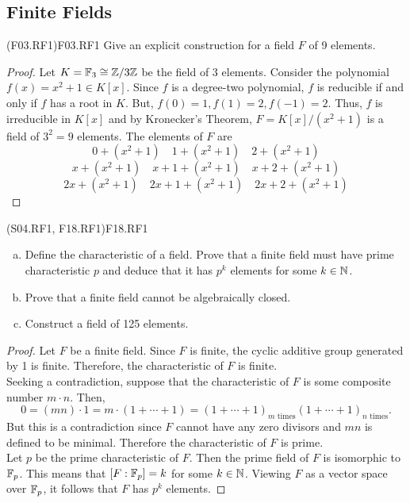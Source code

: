 \documentclass[../AlgebraQualSolutions.tex]{subfiles}
\begin{document}
\subsection{Finite Fields}

\begin{prob}{(F03.RF1)}{F03.RF1}
Give an explicit construction for a field $F$ of 9 elements.
\end{prob}
\begin{proof}
	Let $K = \mathbb{F}_3 \cong \mathbb{Z}/3\mathbb{Z}$ be the field of 3 elements. Consider the polynomial $f(x) = x^2 + 1 \in K[x]$. Since $f$ is a degree-two polynomial, $f$ is reducible if and only if $f$ has a root in $K$. But, $f(0) = 1, f(1) = 2, f(-1) = 2$. Thus, $f$ is irreducible in $K[x]$ and by Kronecker's Theorem, $F = K[x]/(x^2 + 1)$ is a field of $3^2 = 9$ elements. The elements of $F$ are
		\[0 + (x^2 + 1) \quad 1 + (x^2 + 1) \quad 2 + (x^2 + 1)\]
		\[x + (x^2 + 1) \quad x + 1 + (x^2 + 1) \quad x + 2 + (x^2 + 1)\]
		\[2x + (x^2 + 1) \quad 2x + 1 + (x^2 + 1) \quad 2x + 2 + (x^2 + 1)\]
\end{proof}

\begin{prob}{(S04.RF1, F18.RF1)}{F18.RF1}
	\begin{enumerate}[(a)]
		\item Define the characteristic of a field. Prove that a finite field must have prime characteristic $p$ and deduce that it has $p^k$ elements for some $k \in \mathbb{N}$.
		\item Prove  that a finite field cannot be algebraically closed.
		\item Construct a field of 125 elements.
	\end{enumerate}
\end{prob}

\begin{proof}
	Let $F$ be a finite field. Since $F$ is finite, the cyclic additive  group generated by 1 is finite. Therefore, the characteristic of $F$ is finite.\\
	
	Seeking a contradiction, suppose that the characteristic of $F$ is some composite number $m\cdot n$. Then,
		\[0 = (mn)\cdot 1 = m\cdot (1 + \cdots + 1) = (1 + \cdots + 1)_{\textrm{$m$ times}} (1 + \cdots + 1)_{\textrm{$n$ times}}.\]
	But this is a contradiction since $F$ cannot have any zero divisors and $mn$ is defined to be minimal. Therefore the characteristic of $F$ is prime.\\

	Let $p$ be the prime characteristic of $F$. Then the prime field of $F$ is isomorphic to $\mathbb{F}_p$. This means that $[F: \mathbb{F}_p] = k$ for some $k \in \mathbb{N}$. Viewing $F$ as a vector space over $\mathbb{F}_p$, it follows that $F$ has $p^k$ elements.
\end{proof}
\end{document}
